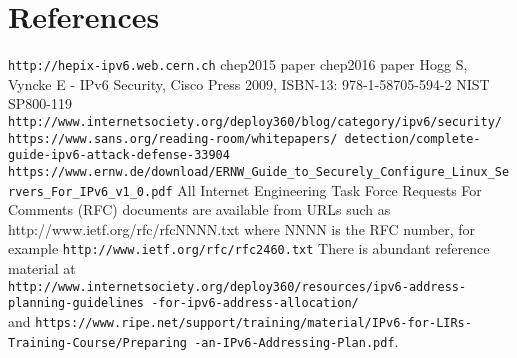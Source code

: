 \section*{References}

\begin{thebibliography}{1}
 {\tt http://hepix-ipv6.web.cern.ch}
 {chep2015 paper}
 {chep2016 paper}
    Hogg S, Vyncke E - IPv6 Security, Cisco Press 2009, ISBN-13: 978-1-58705-594-2
 {NIST SP800-119}
 {\tt http://www.internetsociety.org/deploy360/blog/category/ipv6/security/}
 {\tt https://www.sans.org/reading-room/whitepapers/ \hfill \break detection/complete-guide-ipv6-attack-defense-33904}
 {\tt https://www.ernw.de/download/ERNW\_Guide\_to\_Securely\_Configure\_Linux\_Servers\_For\_IPv6\_v1\_0.pdf}
 All Internet Engineering Task Force Requests For Comments (RFC) documents are available
from URLs such as http://www.ietf.org/rfc/rfcNNNN.txt where NNNN is the RFC number, for example {\tt http://www.ietf.org/rfc/rfc2460.txt}
 There is abundant reference material at \\
{\tt http://www.internetsociety.org/deploy360/resources/ipv6-address-planning-guidelines \hfill \break -for-ipv6-address-allocation/} \\
and {\tt https://www.ripe.net/support/training/material/IPv6-for-LIRs-Training-Course/Preparing \hfill \break-an-IPv6-Addressing-Plan.pdf}.
\end{thebibliography}
